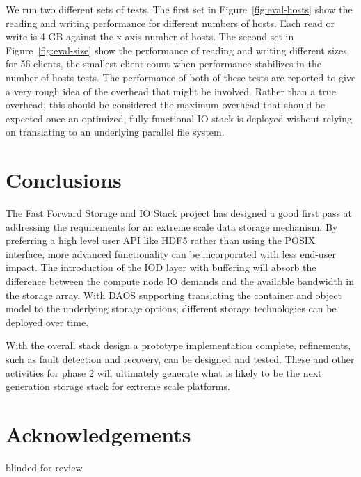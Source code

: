 \documentclass[conference]{IEEEtran} \pdfpagewidth=8.5in
\begin{document}
We run two different sets of tests. The first set in
Figure~\ref{fig:eval-hosts} show the reading and writing performance for
different numbers of hosts. Each read or write is 4 GB against the x-axis
number of hosts. The second set in Figure~\ref{fig:eval-size} show the
performance of reading and writing different sizes for 56 clients, the smallest
client count when performance stabilizes in the number of hosts tests.  The
performance of both of these tests are reported to give a very rough idea of
the overhead that might be involved. Rather than a true overhead, this should
be considered the maximum overhead that should be expected once an optimized,
fully functional IO stack is deployed without relying on translating to an
underlying parallel file system. 

\section{Conclusions}
\label{sec:conclusion}

The Fast Forward Storage and IO Stack project has designed a good first pass at
addressing the requirements for an extreme scale data storage mechanism.  By
preferring a high level user API like HDF5 rather than using the POSIX
interface, more advanced functionality can be incorporated with less end-user
impact. The introduction of the IOD layer with buffering will absorb the
difference between the compute node IO demands and the available bandwidth in
the storage array. With DAOS supporting translating the container and object
model to the underlying storage options, different storage technologies can be
deployed over time.

With the overall stack design a prototype implementation complete, refinements,
such as fault detection and recovery, can be designed and tested.  These and
other activities for phase 2 will ultimately generate what is likely to be the
next generation storage stack for extreme scale platforms.

\section{Acknowledgements}

blinded for review





\vfill\eject
\end{document}
